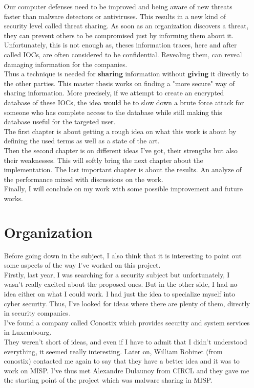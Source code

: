 \documentclass{eplmastersthesis}
\begin{document}
Our computer defenses need to be improved and being aware of new threats faster than malware detectors or antiviruses. This results in a new kind of security level called threat sharing. As soon as an organization discovers a threat, they can prevent others to be compromised just by informing them about it. \\
Unfortunately, this is not enough as, theses information traces, here and after called IOCs, are often considered to be confidential. Revealing them, can reveal damaging information for the companies.\\
Thus a technique is needed for \textbf{sharing} information without \textbf{giving} it directly to the other parties. This master thesis works on finding a "more secure" way of sharing information. More precisely, if we attempt to create an encrypted database of these IOCs, the idea would be to slow down a brute force attack for someone who has complete access to the database while still making this database useful for the targeted user.\\

The first chapter is about getting a rough idea on what this work is about by defining the used terms as well as a state of the art.\\
Then the second chapter is on different ideas I've got, their strengths but also their weaknesses. This will softly bring the next chapter about the implementation.
The last important chapter is about the results. An analyze of the performance mixed with discussions on the work.\\
Finally, I will conclude on my work with some possible improvement and future works.

\section{Organization}
Before going down in the subject, I also think that it is interesting to point out some aspects of the way I've worked on this project.\\
Firstly, last year, I was searching for a security subject but unfortunately, I wasn't really excited about the proposed ones. But in the other side, I had no idea either on what I could work. I had just the idea to specialize myself into cyber security. Thus, I've looked for ideas where there are plenty of them, directly in security companies.\\
I've found a company called Conostix which provides security and system services in Luxembourg.\\
They weren't short of ideas, and even if I have to admit that I didn't understood everything, it seemed really interesting. Later on, William Robinet (from conostix) contacted me again to say that they have a better idea and it was to work on MISP. I've thus met Alexandre Dulaunoy from CIRCL and they gave me the starting point of the project which was malware sharing in MISP.\\
\end{document}
